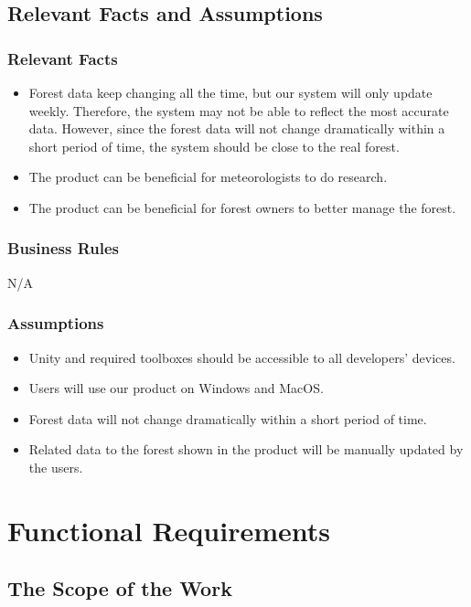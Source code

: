 \documentclass{article}
\begin{document}
\subsection{Relevant Facts and Assumptions}
\subsubsection{Relevant Facts}
\begin{itemize}
    \item Forest data keep changing all the time, but our 
    system will only update weekly. Therefore, the 
    system may not be able to reflect the most accurate data. 
    However, since the forest data will not change dramatically
    within a short period of time, the system should be 
    close to the real forest.
    \item The product can be beneficial for meteorologists to do research.
    \item The product can be beneficial for forest owners 
    to better manage the forest.
\end{itemize}

\subsubsection{Business Rules}
N/A

\subsubsection{Assumptions}
\begin{itemize}
    \item Unity and required toolboxes 
    should be accessible to all developers'
    devices.
    \item Users will use our product on Windows and MacOS.
    \item Forest data will not change dramatically within a 
    short period of time. 
    \item Related data to the forest shown in the product will be manually updated by the users.
\end{itemize}

\newpage

\section{Functional Requirements}
\subsection{The Scope of the Work}
\end{document}
